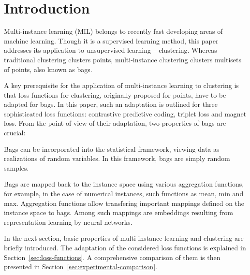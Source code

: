 \section{Introduction}

Multi-instance learning (MIL) belongs to recently fast developing areas of machine learning. Though it is a supervised learning method, this paper addresses its application to unsupervised learning -- clustering. Whereas traditional clustering clusters points, multi-instance clustering clusters multisets of points, also known as bags.

A key prerequisite for the application of multi-instance learning to clustering is that loss functions for clustering, originally proposed for points, have to be adapted for bags. In this paper, such an adaptation is outlined for three sophisticated loss functions: contrastive predictive coding, triplet loss and magnet loss. From the point of view of their adaptation, two properties of bags are crucial:
\begin{romanitems}
	\item Bags can be incorporated into the statistical framework, viewing data as realizations of random variables. In this framework, bags are simply random samples.
	\item Bags are mapped back to the instance space using various aggregation functions, for example, in the case of numerical instances, such functions as mean, min and max. Aggregation functions allow transfering important mappings defined on the instance space to bags. Among such mappings are embeddings resulting from representation learning by neural networks.
\end{romanitems}

In the next section, basic properties of multi-instance learning and clustering are briefly introduced. The adaptation of the considered loss functions is explained in Section~\ref{sec:loss-functions}. A comprehensive comparison of them is then presented in Section~\ref{sec:experimental-comparison}.
